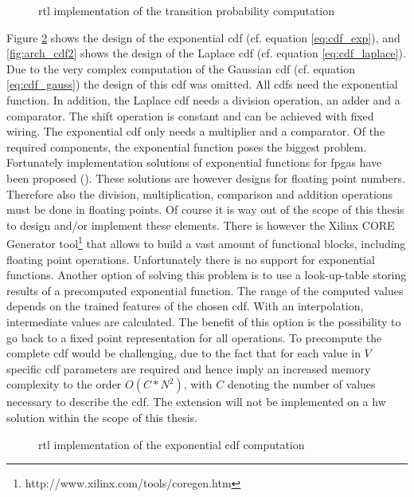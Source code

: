\documentclass[mscthesis]{usiinfthesis}
\begin{document}
\begin{figure}
    \centering
    
    \caption{\acrshort{rtl} implementation of the transition probability
        computation}
    \label{fig:arch_ext}
\end{figure}

Figure \ref{fig:arch_cdf1} shows the design of the exponential \gls{cdf} (cf.
equation \ref{eq:cdf_exp}), and \ref{fig:arch_cdf2} shows the design of the
Laplace \gls{cdf} (cf. equation \ref{eq:cdf_laplace}). Due to the very complex
computation of the Gaussian \gls{cdf} (cf. equation \ref{eq:cdf_gauss}) the
design of this \gls{cdf} was omitted. All \glspl{cdf} need the exponential
function. In addition, the Laplace \gls{cdf} needs a division operation, an
adder and a comparator. The shift operation is constant and can be achieved
with fixed wiring. The exponential \gls{cdf} only needs a multiplier and
a comparator. Of the required components, the exponential function poses the
biggest problem. Fortunately implementation solutions of exponential functions
for \glspl{fpga} have been proposed (\cite{RSSI08_Pottathuparambil,
ICFPT05_Detrey}). These solutions are however designs for floating point
numbers. Therefore also the division, multiplication, comparison and addition
operations must be done in floating points. Of course it is way out of the
scope of this thesis to design and/or implement these elements. There is
however the Xilinx CORE Generator
tool\footnote{http://www.xilinx.com/tools/coregen.htm} that allows to build
a vast amount of functional blocks, including floating point operations.
Unfortunately there is no support for exponential functions. Another option of
solving this problem is to use a look-up-table storing results of a precomputed
exponential function. The range of the computed values depends on the trained
features of the chosen \gls{cdf}. With an interpolation, intermediate values
are calculated. The benefit of this option is the possibility to go back to
a fixed point representation for all operations. To precompute the complete
\gls{cdf} would be challenging, due to the fact that for each value in $V$
specific \gls{cdf} parameters are required and hence imply an increased memory
complexity to the order $O(C*N^2)$, with $C$ denoting the number of values
necessary to describe the \gls{cdf}. The extension will not be implemented on
a \gls{hw} solution within the scope of this thesis.

\begin{figure}
    \centering
    
    \caption{\acrshort{rtl} implementation of the exponential \acrshort{cdf}
        computation}
    \label{fig:arch_cdf1}
\end{figure}
\end{document}
